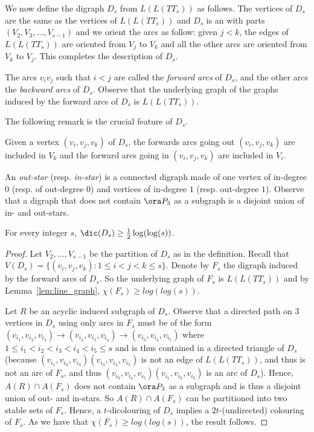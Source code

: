 We now define the digraph $D_s$ from $L(L(TT_s))$ as follows. 
The vertices of $D_s$ are the same as the vertices of  $L(L(TT_s))$ and  
$D_s$ is an \omg  with parts $(V_2, V_3, \dots, V_{s-1})$ and we orient the arcs as follow: given $j<k$, the edges of $L(L(TT_s))$ are oriented from $V_j$ to $V_k$ and all the other arcs are oriented from $V_k$ to $V_j$. This completes the description of $D_s$. 

The arcs $v_iv_j$ such that $i<j$ are called the \emph{forward arcs} of $D_s$, and the other arcs the \emph{backward arcs} of $D_s$. Observe that the underlying graph of the graphs induced by the forward arcs of $D_s$ is $L(L(TT_s))$. 

The following remark is the crucial feature of $D_s$. 
\begin{remark}\label{rmk:Ds}
Given a vertex $(v_i,v_j,v_k)$ of $D_s$, the forwards arcs going out $(v_i,v_j,v_k)$ are included in $V_k$ and the forward arcs going in $(v_i,v_j,v_k)$ are included in $V_i$. 
\end{remark}

An \emph{out-star} (resp. \emph{in-star}) is a connected digraph made of one vertex of in-degree $0$ (resp. of out-degree $0$) and vertices of in-degree $1$ (resp. out-degree $1$). Observe that a digraph that does not contain $\ora P_3$ as a subgraph is a disjoint union of in- and out-stars. 

\begin{lemma}\label{lem:Ds_dic}
For every integer $s$, $\dic(D_s) \geq \frac{1}{2}\log(\log(s))$. 
\end{lemma}

\begin{proof}
Let $V_2, \dots, V_{s-1}$ be the partition of $D_s$ as in the definition. Recall that $V(D_s) = \{(v_i,v_j,v_k): 1\leq i<j<k\leq s\}$. 
Denote by $F_s$ the digraph induced by the forward arcs of $D_s$. So the underlying graph of $F_s$ is $L(L(TT_s))$ and by Lemma~\ref{lem:line_graph}, $\chi(F_s) \geq log(log(s))$. 

Let $R$ be an acyclic induced subgraph of $D_s$. 
Observe that a directed path on $3$ vertices in $D_s$ using only arcs in $F_s$ must be of the form $(v_{i_1},v_{i_2},v_{i_3}) \rightarrow (v_{i_2},v_{i_3},v_{i_4}) \rightarrow (v_{i_3},v_{i_4},v_{i_5})$  
where $1\leq i_1<i_2<i_3<i_4<i_5 \leq s$ and is thus contained in a directed triangle of $D_s$ (because $(v_{i_1},v_{i_2},v_{i_3})(v_{i_3},v_{i_4},v_{i_5})$ is not an edge of $L(L(TT_s))$, and thus is not an arc of $F_s$, and thus $(v_{i_3},v_{i_4},v_{i_5})(v_{i_1},v_{i_2},v_{i_3})$ is an arc of $D_s$).  
Hence, $A(R) \cap A(F_s)$ does not contain $\ora P_3$ as a subgraph and is thus a disjoint union of  out- and in-stars. So  $A(R) \cap A(F_s)$ can be partitioned into two stable sets of $F_s$.  
Hence, a $t$-dicolouring of $D_s$ implies a $2t$-(undirected) colouring of $F_s$. As we have that $\chi(F_s) \geq log(log(s))$, the result follows. 
\end{proof}


